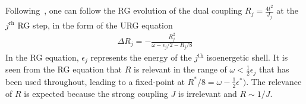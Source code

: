 \documentclass[reprint,prb,superscriptaddress]{revtex4-2}
\begin{document}
Following~\cite{anirbanmott1}, one can follow the RG evolution of the dual coupling \(R_j = \frac{4t^2}{J_j}\) at the \(j^\text{rh}\) RG step, in the form of the URG equation
\begin{equation}\begin{aligned}
	\Delta R_j =- \frac{R_j^2}{\omega - \epsilon_{j}/2 - R_j/8}
\end{aligned}\end{equation}
In the RG equation, \(\epsilon_{j}\) represents the energy of the \(j^\text{th}\) isoenergetic shell. It is seen from the RG equation that \(R\) is relevant in the range of \(\omega < \frac{1}{2}\epsilon_j\) that has been used throughout, leading to a fixed-point at \(R^*/8 = \omega - \frac{1}{2}\epsilon^*)\). The relevance of \(R\) is expected because the strong coupling \(J\) is irrelevant and \(R \sim 1/J\).
\end{document}
